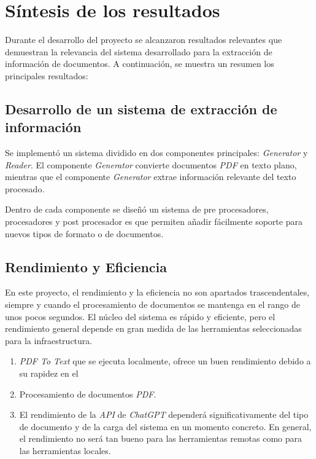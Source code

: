 \section{Síntesis de los resultados}

Durante el desarrollo del proyecto se alcanzaron resultados relevantes que demuestran la relevancia del sistema
desarrollado para la extracción de información de documentos.
A continuación, se muestra un resumen los principales resultados:

\subsection*{Desarrollo de un sistema de extracción de información}

Se implementó un sistema dividido en dos componentes principales: \textit{Generator} y \textit{Reader}.
El componente \textit{Generator} convierte documentos \textit{PDF} en texto plano, mientras que el componente
\textit{Generator} extrae información relevante del texto procesado.

Dentro de cada componente se diseñó un sistema de pre procesadores, procesadores y post procesador es que permiten
añadir fácilmente soporte para nuevos tipos de formato o de documentos.

\subsection*{Rendimiento y Eficiencia}

En este proyecto, el rendimiento y la eficiencia no son apartados trascendentales, siempre y cuando el procesamiento de
documentos se mantenga en el rango de unos pocos segundos.
El núcleo del sistema es rápido y eficiente, pero el rendimiento general depende en gran medida de las herramientas
seleccionadas para la infraestructura.

\begin{enumerate}
    \item \textit{PDF To Text} que se ejecuta localmente, ofrece un buen rendimiento debido a su rapidez en el
    \item Procesamiento de documentos \textit{PDF}.
    \item El rendimiento de la \textit{API} de \textit{ChatGPT} dependerá significativamente del tipo de documento y de
    la carga del sistema en un momento concreto.
    En general, el rendimiento no será tan bueno para las herramientas remotas como para las herramientas locales.
\end{enumerate}


